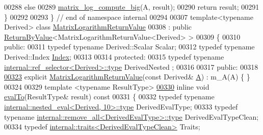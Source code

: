 \begin{DoxyCode}
00288   \textcolor{keywordflow}{else}
00289     \hyperlink{namespace_eigen_1_1internal_ac2de7acbbff34ec236ee5e9fdb2eee38}{matrix\_log\_compute\_big}(A, result);
00290   \textcolor{keywordflow}{return} result;
00291 \}
00292 
00293 \} \textcolor{comment}{// end of namespace internal}
00294 
00307 \textcolor{keyword}{template}<\textcolor{keyword}{typename} Derived> \textcolor{keyword}{class }\hyperlink{class_eigen_1_1_matrix_logarithm_return_value}{MatrixLogarithmReturnValue}
00308 : \textcolor{keyword}{public} \hyperlink{group___core___module_class_eigen_1_1_return_by_value}{ReturnByValue}<MatrixLogarithmReturnValue<Derived> >
00309 \{
00310 \textcolor{keyword}{public}:
00311   \textcolor{keyword}{typedef} \textcolor{keyword}{typename} Derived::Scalar Scalar;
00312   \textcolor{keyword}{typedef} \textcolor{keyword}{typename} Derived::Index \hyperlink{namespace_eigen_a62e77e0933482dafde8fe197d9a2cfde}{Index};
00313 
00314 \textcolor{keyword}{protected}:
00315   \textcolor{keyword}{typedef} \textcolor{keyword}{typename} \hyperlink{class_eigen_1_1internal_1_1_tensor_lazy_evaluator_writable}{internal::ref\_selector<Derived>::type} DerivedNested
      ;
00316 
00317 \textcolor{keyword}{public}:
00318 
\hyperlink{class_eigen_1_1_matrix_logarithm_return_value_adfd2417a3d6f671e156b4ab1b92f1837}{00323}   \textcolor{keyword}{explicit} \hyperlink{class_eigen_1_1_matrix_logarithm_return_value_adfd2417a3d6f671e156b4ab1b92f1837}{MatrixLogarithmReturnValue}(\textcolor{keyword}{const} Derived& \hyperlink{group___core___module_class_eigen_1_1_matrix}{A}) : m\_A(A) \{ \}
00324   
00329   \textcolor{keyword}{template} <\textcolor{keyword}{typename} ResultType>
\hyperlink{class_eigen_1_1_matrix_logarithm_return_value_ac17537a51ce53a44746fabd7a83d29d3}{00330}   \textcolor{keyword}{inline} \textcolor{keywordtype}{void} \hyperlink{class_eigen_1_1_matrix_logarithm_return_value_ac17537a51ce53a44746fabd7a83d29d3}{evalTo}(ResultType& result)\textcolor{keyword}{ const}
00331 \textcolor{keyword}{  }\{
00332     \textcolor{keyword}{typedef} \textcolor{keyword}{typename} \hyperlink{class_eigen_1_1internal_1_1_tensor_lazy_evaluator_writable}{internal::nested\_eval<Derived, 10>::type} 
      DerivedEvalType;
00333     \textcolor{keyword}{typedef} \textcolor{keyword}{typename} \hyperlink{group___sparse_core___module}{internal::remove\_all<DerivedEvalType>::type}
       DerivedEvalTypeClean;
00334     \textcolor{keyword}{typedef} \hyperlink{struct_eigen_1_1internal_1_1traits}{internal::traits<DerivedEvalTypeClean>} Traits;

\end{DoxyCode}
